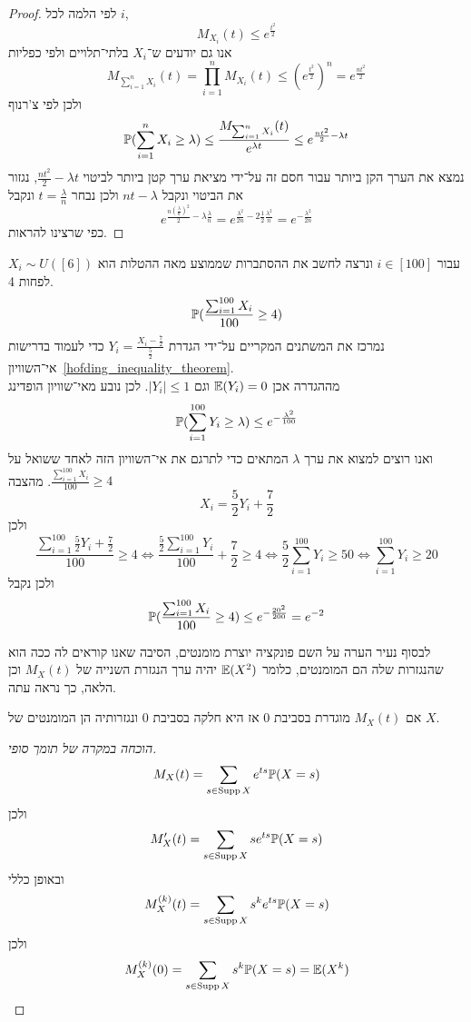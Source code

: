 \begin{proof}
	לפי הלמה לכל $i$,
	\[
		M_{X_i}(t) \le e^{\frac{t^2}{2}}
	\]
	אנו גם יודעים ש־$X_i$ בלתי־תלויים ולפי כפליות
	\[
		M_{\sum_{i = 1}^{n} X_i}(t)
		= \prod_{i = 1}^n M_{X_i}(t)
		\le {(e^{\frac{t^2}{2}})}^n
		= e^{\frac{nt^2}{2}}
	\]
	ולכן לפי צ'רנוף
	\[
		\mathbb{P}(\sum_{i = 1}^{n} X_i \ge \lambda)
		\le \frac{M_{\sum_{i = 1}^{n} X_i}(t)}{e^{\lambda t}}
		\le e^{\frac{nt^2}{2} - \lambda t}
	\]
	נמצא את הערך הקן ביותר עבור חסם זה על־ידי מציאת ערך קטן ביותר לביטוי $\frac{n t^2}{2} - \lambda t$, נגזור את הביטוי ונקבל $nt - \lambda$ ולכן נבחר $t = \frac{\lambda}{n}$ ונקבל
	\[
		e^{\frac{n {(\frac{\lambda}{n})}^2}{2} - \lambda \frac{\lambda}{n}}
		= e^{\frac{\lambda^2}{2n} - 2 \frac{1}{2}\frac{\lambda^2}{n}}
		= e^{-\frac{\lambda^2}{2n}}
	\]
	כפי שרצינו להראות.
\end{proof}
\begin{example}
	$X_i \sim U([6])$ עבור $i \in [100]$ ונרצה לחשב את ההסתברות שממוצע מאה ההטלות הוא לפחות 4.
	\[
		\mathbb{P}(\frac{\sum_{i = 1}^{100} X_i}{100} \ge 4)
	\]
	נמרכז את המשתנים המקריים על־ידי הגדרת $Y_i = \frac{X_i - \frac{7}{2}}{\frac{5}{2}}$ כדי לעמוד בדרישות אי־השוויון\ \ref{hofding_inequality_theorem}. \\
	מההגדרה אכן $\mathbb{E}(Y_i) = 0$ וגם $|Y_i| \le 1$.
	לכן נובע מאי־שוויון הופדינג
	\[
		\mathbb{P}(\sum_{i = 1}^{100} Y_i \ge \lambda)
		\le e^{- \frac{\lambda^2}{100}}
	\]
	ואנו רוצים למצוא את ערך $\lambda$ המתאים כדי לתרגם את אי־השוויון הזה לאחד ששואל על $\frac{\sum_{i = 1}^{100} X_i}{100} \ge 4$.
	מהצבה
	\[
		X_i = \frac{5}{2} Y_i + \frac{7}{2}
	\]
	ולכן
	\[
		\frac{\sum_{i = 1}^{100} \frac{5}{2} Y_i + \frac{7}{2}}{100} \ge 4
		\iff
		\frac{\frac{5}{2} \sum_{i = 1}^{100} Y_i}{100} + \frac{7}{2} \ge 4
		\iff
		\frac{5}{2} \sum_{i = 1}^{100} Y_i \ge 50
		\iff
		\sum_{i = 1}^{100} Y_i \ge 20
	\]
	ולכן נקבל
	\[
		\mathbb{P}(\frac{\sum_{i = 1}^{100} X_i}{100} \ge 4)
		\le e^{- \frac{20^2}{200}}
		= e^{-2}
	\]
\end{example}
לבסוף נעיר הערה על השם פונקציה יוצרת מומנטים, הסיבה שאנו קוראים לה ככה הוא שהנגזרות שלה הם המומנטים, כלומר $\mathbb{E}(X^2)$ יהיה ערך הנגזרת השנייה של $M_X(t)$ וכן הלאה, כך נראה עתה.
\begin{proposition}
	אם $M_X(t)$ מוגדרת בסביבת $0$ אז היא חלקה בסביבת $0$ ונגזרותיה הן המומנטים של $X$.
\end{proposition}
\begin{proof}[הוכחה במקרה של תומך סופי]
	\[
		M_X(t)
		= \sum_{s \in \operatorname{Supp} X} e^{ts} \mathbb{P}(X = s)
	\]
	ולכן
	\[
		M_X'(t)
		= \sum_{s \in \operatorname{Supp} X} s e^{ts} \mathbb{P}(X = s)
	\]
	ובאופן כללי
	\[
		M_X^{(k)}(t)
		= \sum_{s \in \operatorname{Supp} X} s^k e^{ts} \mathbb{P}(X = s)
	\]
	ולכן
	\[
		M_X^{(k)}(0)
		= \sum_{s \in \operatorname{Supp} X} s^k \mathbb{P}(X = s)
		= \mathbb{E}(X^k)
	\]
\end{proof}

